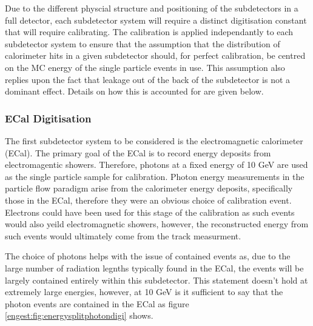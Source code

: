 Due to the different physcial structure and positioning of the subdetectors in a full detector, each subdetector system will require a distinct digitisation constant that will require calibrating.  The calibration is applied independantly to each subdetector system to ensure that the assumption that the distribution of calorimeter hits in a given subdetector should, for perfect calibration, be centred on the MC energy of the single particle events in use.  This assumption also replies upon the fact that leakage out of the back of the subdetector is not a dominant effect.  Details on how this is accounted for are given below.

\subsubsection{ECal Digitisation}

The first subdetector system to be considered is the electromagnetic calorimeter (ECal).  The primary goal of the ECal is to record energy deposits from electromagentic showers.  Therefore, photons at a fixed energy of 10 GeV are used as the single particle sample for calibration.  Photon energy measurements in the particle flow paradigm arise from the calorimeter energy deposits, specifically those in the ECal, therefore they were an obvious choice of calibration event.  Electrons could have been used for this stage of the calibration as such events would also yeild electromagnetic showers, however, the reconstructed energy from such events would ultimately come from the track measurment.  


The choice of photons helps with the issue of contained events as, due to the large number of radiation legnths typically found in the ECal, the events will be largely contained entirely within this subdetector.  This statement doesn't hold at extremely large energies, however, at 10 GeV is it sufficient to say that the photon events are contained in the ECal as figure \ref{engest:fig:energysplitphotondigi} shows.

